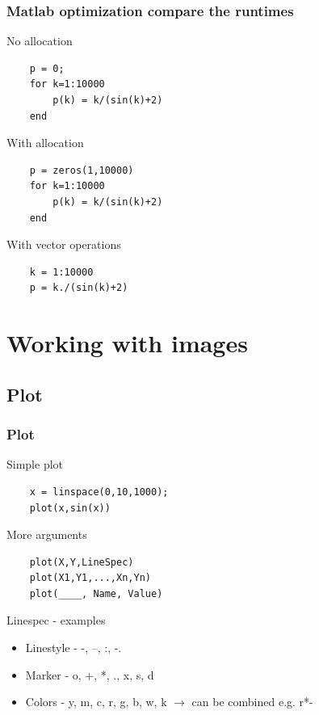 \documentclass{beamer}
\begin{document}
\begin{frame}[fragile]
\frametitle{Matlab optimization compare the runtimes}
  \begin{block}{No allocation}
  \begin{verbatim}
    p = 0;
    for k=1:10000
        p(k) = k/(sin(k)+2)
    end \end{verbatim}
  \end{block}
  
  \begin{block}{With allocation}
  \begin{verbatim}
    p = zeros(1,10000)
    for k=1:10000
        p(k) = k/(sin(k)+2)
    end \end{verbatim}
  \end{block}
  
  \begin{block}{With vector operations}
  \begin{verbatim}
    k = 1:10000
    p = k./(sin(k)+2) \end{verbatim}
  \end{block}
\end{frame}

\section{Working with images}

\subsection{Plot}

\begin{frame}[fragile]
\frametitle{Plot}
  \begin{block}{Simple plot}
  \begin{verbatim}
    x = linspace(0,10,1000);
    plot(x,sin(x)) \end{verbatim}
  \end{block}
  
  \begin{block}{More arguments}
  \begin{verbatim}
    plot(X,Y,LineSpec) 
    plot(X1,Y1,...,Xn,Yn)
    plot(____, Name, Value) \end{verbatim}
  \end{block}
  
   \begin{block}{Linespec - examples}
   \begin{itemize}
    \item Linestyle - -, --, :, -.
    \item Marker - o, +, *, ., x, s, d
    \item Colors - y, m, c, r, g, b, w, k $\rightarrow$ can be combined e.g. r*-
   \end{itemize}
  \end{block}
\end{frame}
\end{document}
